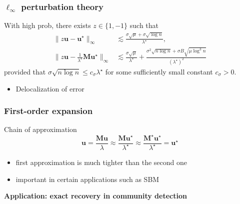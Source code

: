 \documentclass[compress,
mathserif,wide,%
]{beamer}
\begin{document}
\begin{frame}
	\frametitle{$\ell_{\infty}$ perturbation theory}
\begin{theorem}
	With high prob, there exists $z \in \{1, -1\}$ such that 
%
\begin{subequations}
\label{eq:UsgnH-Ustar-MUstar-bound-theorem-general}
\begin{align}
\big\|z\bm{u}-\bm{u}^{\star}\big\|_{\infty}  &\lesssim \frac{\sigma\sqrt{\mu}+\sigma\sqrt{\log n}}{ \lambda^{\star} },
\label{eq:UsgnH-Ustar-bound-theorem-general}\\
\big\|z\bm{u}-\frac{1}{\lambda^{\star}}\bm{M}\bm{u}^{\star}\big\|_{\infty} &\lesssim \frac{\sigma\sqrt{\mu}}{ \lambda^{\star} }+ \frac{\sigma^{2}\sqrt{n\log n}+\sigma B\sqrt{\mu \log^{3}n}}{(\lambda^{\star})^{2} }
\label{eq:UsgnH-MUstar-bound-theorem-general}
\end{align}
\end{subequations}
%
provided that $\sigma \sqrt{n \log n}  \leq c_{\sigma}\lambda^{\star} $ for some sufficiently small constant $c_{\sigma}>0$. 
\end{theorem}

\vfill
\begin{itemize}
	\item Delocalization of error
\end{itemize}
\end{frame}

\begin{frame}
	\frametitle{First-order expansion}
	
	Chain of approximation
	\[
	\bm{u} = \frac{\bm{M} \bm{u}}{\lambda} \approx \frac{\bm{M} \bm{u}^\star}{ \lambda^\star} \approx \frac{\bm{M}^\star \bm{u}^\star}{ \lambda^\star} = \bm{u^\star}
	\]
	\vfill
	\begin{itemize}
		\item first approximation is much tighter than the second one
		\item important in certain applications such as SBM
	\end{itemize}
\end{frame}

\begin{frame}[plain]
\vfill
\centering
{\Large \bf Application: exact recovery in community detection}
\vfill
\end{frame}
\end{document}
